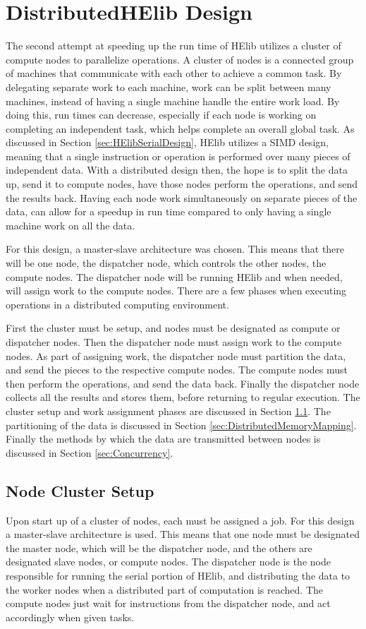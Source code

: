 \chapter{DistributedHElib Design} \label{chap:DistributedHElibDesign}
The second attempt at speeding up the run time of HElib utilizes a cluster of compute nodes to parallelize operations. A cluster of nodes is a connected group of machines that communicate with each other to achieve a common task. By delegating separate work to each machine, work can be split between many machines, instead of having a single machine handle the entire work load. By doing this, run times can decrease, especially if each node is working on completing an independent task, which helps complete an overall global task. As discussed in Section \ref{sec:HElibSerialDesign}, HElib utilizes a SIMD design, meaning that a single instruction or operation is performed over many pieces of independent data. With a distributed design then, the hope is to split the data up, send it to compute nodes, have those nodes perform the operations, and send the results back. Having each node work simultaneously on separate pieces of the data, can allow for a speedup in run time compared to only having a single machine work on all the data.

For this design, a master-slave architecture was chosen. This means that there will be one node, the dispatcher node, which controls the other nodes, the compute nodes. The dispatcher node will be running HElib and when needed, will assign work to the compute nodes. There are a few phases when executing operations in a distributed computing environment.

First the cluster must be setup, and nodes must be designated as compute or dispatcher nodes. Then the dispatcher node must assign work to the compute nodes. As part of assigning work, the dispatcher node must partition the data, and send the pieces to the respective compute nodes. The compute nodes must then perform the operations, and send the data back. Finally the dispatcher node collects all the results and stores them, before returning to regular execution. The cluster setup and work assignment phases are discussed in Section \ref{sec:NodeClusterSetup}. The partitioning of the data is discussed in Section \ref{sec:DistributedMemoryMapping}. Finally the methods by which the data are transmitted between nodes is discussed in Section \ref{sec:Concurrency}.
 
\section{Node Cluster Setup} \label{sec:NodeClusterSetup}
Upon start up of a cluster of nodes, each must be assigned a job. For this design a master-slave architecture is used. This means that one node must be designated the master node, which will be the dispatcher node, and the others are designated slave nodes, or compute nodes. The dispatcher node is the node responsible for running the serial portion of HElib, and distributing the data to the worker nodes when a distributed part of computation is reached. The compute nodes just wait for instructions from the dispatcher node, and act accordingly when given tasks.

